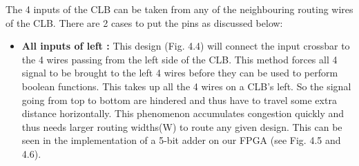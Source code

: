 The 4 inputs of the CLB can be taken from any of the neighbouring routing wires of the CLB. There are 2 cases to put the pins as discussed below:

\begin{itemize}
\item \textbf{All inputs of left :} This design (Fig. 4.4) will connect the input crossbar to the 4 wires passing from the left side of the CLB. This method forces all 4 signal to be brought to the left 4 wires before they can be used to perform boolean functions. This takes up all the 4 wires on a CLB's left. So the signal going from top to bottom are hindered and thus have to travel some extra distance horizontally. This phenomenon accumulates congestion quickly and thus needs larger routing widths(W) to route any given design. This can be seen in the implementation of a 5-bit adder on our FPGA (see Fig. 4.5 and 4.6).


\end{itemize}
